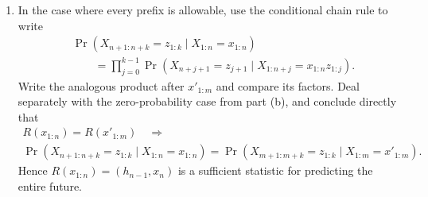 \documentclass[11pt]{article}
\begin{document}
\begin{exercise}
\begin{enumerate}
    \item In the case where every prefix is allowable, use the conditional
      chain rule to write
      \[
        \begin{aligned}
        &\Pr\!\left(
          X_{n+1:n+k}=z_{1:k}\mid X_{1:n}=x_{1:n}
        \right)\\
        &\qquad=
        \prod_{j=0}^{k-1}
        \Pr\!\left(
          X_{n+j+1}=z_{j+1}
          \mid X_{1:n+j}=x_{1:n}z_{1:j}
        \right).
        \end{aligned}
      \]
      Write the analogous product after $x'_{1:m}$ and compare its factors.
      Deal separately with the zero-probability case from part (b), and
      conclude directly that
      \[
        \begin{gathered}
          R(x_{1:n})=R(x'_{1:m})
          \quad\Longrightarrow\\[1mm]
          \Pr\!\left(
            X_{n+1:n+k}=z_{1:k}\mid X_{1:n}=x_{1:n}
          \right)
          =
          \Pr\!\left(
            X_{m+1:m+k}=z_{1:k}\mid X_{1:m}=x'_{1:m}
          \right).
        \end{gathered}
      \]
      Hence $R(x_{1:n})=(h_{n-1},x_n)$ is a sufficient statistic for
      predicting the entire future.
  \end{enumerate}
\end{exercise}
\end{document}
